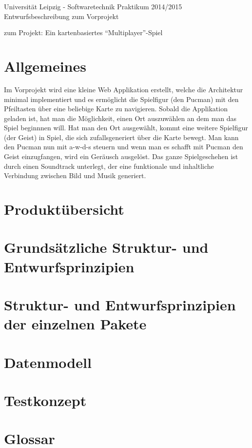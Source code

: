 \documentclass[11pt,a4paper]{article}
\begin{document}
\center \large Universität Leipzig - Softwaretechnik Praktikum 2014/2015\\
\center \Huge Entwurfsbeschreibung zum Vorprojekt \\
\par\bigskip

\small zum Projekt: Ein kartenbasiertes “Multiplayer”-Spiel

\par\bigskip

\tableofcontents

\clearpage

\flushleft
\section{Allgemeines}
Im Vorprojekt wird eine kleine Web Applikation erstellt, welche die Architektur minimal implementiert und es ermöglicht die Spielfigur (den Pucman) mit den Pfeiltasten über eine beliebige Karte zu navigieren.
Sobald die Applikation geladen ist, hat man die Möglichkeit, einen Ort auszuwählen an dem man das Spiel beginnnen will.
Hat man den Ort ausgewählt, kommt eine weitere Spielfigur (der Geist) in Spiel, die sich zufallsgeneriert über die Karte bewegt. 
Man kann den Pucman nun mit a-w-d-s steuern und wenn man es schafft mit Pucman den Geist einzugfangen, wird ein Geräusch ausgelöst.
Das ganze Spielgeschehen ist durch einen Soundtrack unterlegt, der eine funktionale und inhaltliche Verbindung zwischen Bild und Musik generiert.
\clearpage
\section{Produktübersicht}
\clearpage
\section{Grundsätzliche Struktur- und Entwurfsprinzipien}
\clearpage
\section{Struktur- und Entwurfsprinzipien der einzelnen Pakete}
\clearpage
\section{Datenmodell}
\clearpage
\section{Testkonzept}
\clearpage
\section{Glossar}
\clearpage
\end{document}
